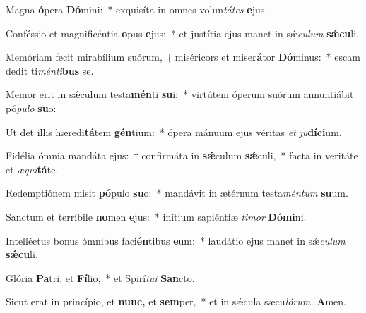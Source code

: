 \item Magna \textbf{ó}pera \textbf{Dó}mini:~* exquisíta in omnes volun\tinyhspace\textit{tá}\textit{tes} \textbf{e}jus.
\item Conféssio et magnificéntia \textbf{o}pus \textbf{e}jus:~* et justítia ejus manet in sǽ\tinyhspace\textit{culum} \textbf{sǽ}\textbf{cu}li.
\item Memóriam fecit mirabílium suórum,~† miséricors et mise\textbf{rá}tor \textbf{Dó}minus:~* escam dedit ti\textit{ménti}\textbf{bus} se.
\item Memor erit in sǽculum testa\textbf{mén}ti \textbf{su}i:~* virtútem óperum suórum annuntiábit pó\textit{pulo} \textbf{su}o:
\item Ut det illis hæredi\textbf{tá}tem \textbf{gén}tium:~* ópera mánuum ejus véritas \textit{et} \textit{ju}\textbf{díci}um.
\item Fidélia ómnia mandáta ejus:~† confirmáta in \textbf{sǽ}culum \textbf{sǽ}culi,~* facta in veritáte et \textit{æqui}\textbf{tá}te.
\item Redemptiónem misit \textbf{pó}pulo \textbf{su}o:~* mandávit in ætérnum testa\textit{méntum} \textbf{su}um.
\item Sanctum et terríbile \textbf{no}men \textbf{e}jus:~* inítium sapiéntiæ \textit{timor} \textbf{Dómi}ni.
\item Intelléctus bonus ómnibus faci\textbf{én}tibus \textbf{e}um:~* laudátio ejus manet in sǽ\textit{culum} \textbf{sǽcu}li.
\item Glória \textbf{Pa}tri, et \textbf{Fí}lio,~* et Spirí\tinyhspace\textit{tui} \textbf{San}cto.
\item Sicut erat in princípio, et \textbf{nunc,} et \textbf{sem}per,~* et in sǽcula sæcu\tinyhspace\textit{lórum.} \textbf{A}men.
